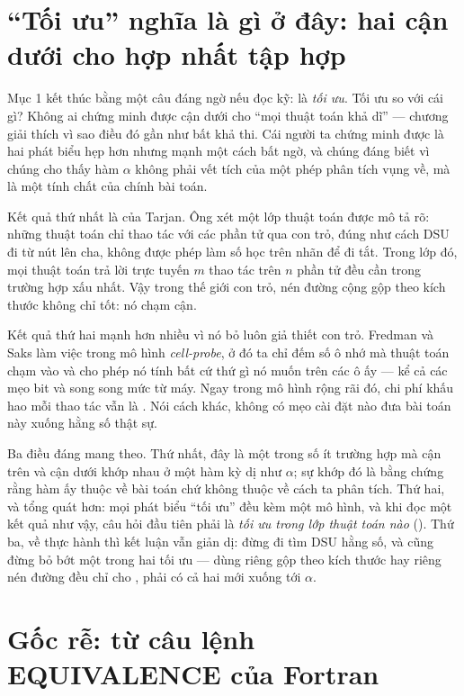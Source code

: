 \documentclass[../../algorithm.tex]{subfiles}
\begin{document}
\section{``Tối ưu'' nghĩa là gì ở đây: hai cận dưới cho hợp nhất tập hợp}

Mục 1 kết thúc bằng một câu đáng ngờ nếu đọc kỹ:  là \emph{tối ưu}. Tối ưu so với cái gì? Không ai chứng minh được cận dưới cho ``mọi thuật toán khả dĩ'' --- chương  giải thích vì sao điều đó gần như bất khả thi. Cái người ta chứng minh được là hai phát biểu hẹp hơn nhưng mạnh một cách bất ngờ, và chúng đáng biết vì chúng cho thấy hàm \(\alpha\) không phải vết tích của một phép phân tích vụng về, mà là một tính chất của chính bài toán.

Kết quả thứ nhất là của Tarjan\cite{tarjan1979}. Ông xét một lớp thuật toán được mô tả rõ: những thuật toán chỉ thao tác với các phần tử qua con trỏ, đúng như cách DSU đi từ nút lên cha, không được phép làm số học trên nhãn để đi tắt. Trong lớp đó, mọi thuật toán trả lời trực tuyến \(m\) thao tác trên \(n\) phần tử đều cần  trong trường hợp xấu nhất. Vậy trong thế giới con trỏ, nén đường cộng gộp theo kích thước không chỉ tốt: nó chạm cận.

Kết quả thứ hai mạnh hơn nhiều vì nó bỏ luôn giả thiết con trỏ. Fredman và Saks\cite{fredman1989} làm việc trong mô hình \emph{cell-probe}, ở đó ta chỉ đếm số ô nhớ mà thuật toán chạm vào và cho phép nó tính bất cứ thứ gì nó muốn trên các ô ấy --- kể cả các mẹo bit và song song mức từ máy. Ngay trong mô hình rộng rãi đó, chi phí khấu hao mỗi thao tác vẫn là \Om{\alpha}. Nói cách khác, không có mẹo cài đặt nào đưa bài toán này xuống hằng số thật sự.

Ba điều đáng mang theo. Thứ nhất, đây là một trong số ít trường hợp mà cận trên và cận dưới khớp nhau ở một hàm kỳ dị như \(\alpha\); sự khớp đó là bằng chứng rằng hàm ấy thuộc về bài toán chứ không thuộc về cách ta phân tích. Thứ hai, và tổng quát hơn: mọi phát biểu ``tối ưu'' đều kèm một mô hình, và khi đọc một kết quả như vậy, câu hỏi đầu tiên phải là \emph{tối ưu trong lớp thuật toán nào} (). Thứ ba, về thực hành thì kết luận vẫn giản dị: đừng đi tìm DSU hằng số, và cũng đừng bỏ bớt một trong hai tối ưu --- dùng riêng gộp theo kích thước hay riêng nén đường đều chỉ cho , phải có cả hai mới xuống tới \(\alpha\).

\section{Gốc rễ: từ câu lệnh EQUIVALENCE của Fortran}
\end{document}
